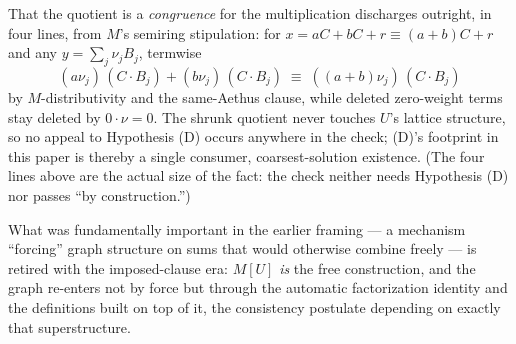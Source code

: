 That the quotient is a \emph{congruence} for the multiplication discharges outright, in four lines, from $M$'s semiring stipulation: for $x = aC + bC + r \equiv (a+b)C + r$ and any $y = \sum_j \nu_j B_j$, termwise
\[
(a\nu_j)\,(C \cdot B_j) + (b\nu_j)\,(C \cdot B_j) \;\equiv\; ((a+b)\nu_j)\,(C \cdot B_j)
\]
by $M$-distributivity and the same-Aethus clause, while deleted zero-weight terms stay deleted by $0 \cdot \nu = 0$. The shrunk quotient never touches $U$'s lattice structure, so no appeal to Hypothesis (D) occurs anywhere in the check; (D)'s footprint in this paper is thereby a single consumer, coarsest-solution existence. (The four lines above are the actual size of the fact: the check neither needs Hypothesis (D) nor passes ``by construction.'')

What was fundamentally important in the earlier framing --- a mechanism ``forcing'' graph structure on sums that would otherwise combine freely --- is retired with the imposed-clause era: $M[U]$ \emph{is} the free construction, and the graph re-enters not by force but through the automatic factorization identity and the definitions built on top of it, the consistency postulate depending on exactly that superstructure.

